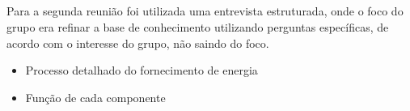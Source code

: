 \subsection{\titulo}
\begin{frame}{\titulo}
Para a segunda reunião foi utilizada uma entrevista estruturada, onde o foco do grupo era refinar a base de conhecimento utilizando perguntas específicas, de acordo com o interesse do grupo, não saindo do foco.
\begin{block}{}
	\begin{itemize}
	\item Processo detalhado do fornecimento de energia
	\item Função de cada componente 
	\end{itemize}
\end{block}
\end{frame}


